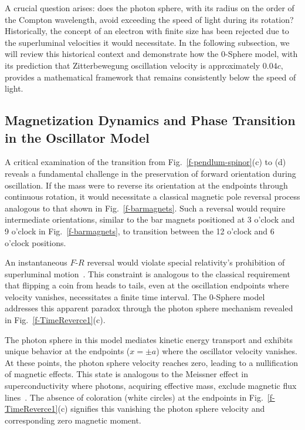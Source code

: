 \documentclass[%
 reprint,
 amsmath,amssymb,
 aps,
]{revtex4-1}
\numberwithin{equation}{section}%
\begin{document}
A crucial question arises: does the photon sphere, with its radius on the order of the Compton wavelength, avoid exceeding the speed of light during its rotation? Historically, the concept of an electron with finite size has been rejected due to the superluminal velocities it would necessitate. In the following subsection, we will review this historical context and demonstrate how the 0-Sphere model, with its prediction that Zitterbewegung oscillation velocity is approximately $0.04c$, provides a mathematical framework that remains consistently below the speed of light.


\subsection{Magnetization Dynamics and Phase Transition in the Oscillator Model}
\label{MagnetizationDynamicsAnd}

A critical examination of the transition from Fig.~\ref{f-pendlum-spinor}(c) to (d) reveals a fundamental challenge in the preservation of forward orientation during oscillation. If the mass were to reverse its orientation at the endpoints through continuous rotation, it would necessitate a classical magnetic pole reversal process analogous to that shown in Fig.~\ref{f-barmagnets}. Such a reversal would require intermediate orientations, similar to the bar magnets positioned at 3 o'clock and 9 o'clock in Fig.~\ref{f-barmagnets}, to transition between the 12 o'clock and 6 o'clock positions.

An instantaneous $F$-$R$ reversal would violate special relativity's prohibition of superluminal motion~\cite{Einstein1905}. This constraint is analogous to the classical requirement that flipping a coin from heads to tails, even at the oscillation endpoints where velocity vanishes, necessitates a finite time interval. The 0-Sphere model addresses this apparent paradox through the photon sphere mechanism revealed in Fig.~\ref{f-TimeReverce1}(c).

The photon sphere in this model mediates kinetic energy transport and exhibits unique behavior at the endpoints ($x = \pm a$) where the oscillator velocity vanishes. At these points, the photon sphere velocity reaches zero, leading to a nullification of magnetic effects. This state is analogous to the Meissner effect in superconductivity where photons, acquiring effective mass, exclude magnetic flux lines~\cite{Cohen1997}. The absence of coloration (white circles) at the endpoints in Fig.~\ref{f-TimeReverce1}(c) signifies this vanishing the photon sphere velocity and corresponding zero magnetic moment.
\end{document}
